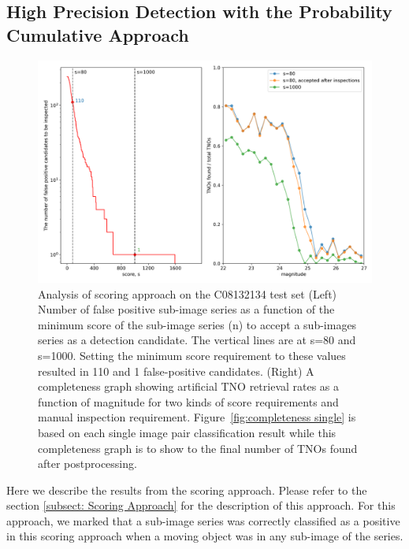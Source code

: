 \subsection{High Precision Detection with the Probability Cumulative Approach}
\label{subsect: High precision with the Probability Cumulative Approach}

\begin{figure}[ht]
    \centering
    \includegraphics[width=\textwidth,keepaspectratio]{Figures/completeness_with_score.png}
    \caption{Analysis of scoring approach on the C08132134 test set (Left) Number of false positive sub-image series as a function of the minimum score of the sub-image series (n) to accept a sub-images series as a detection candidate.
    The vertical lines are at s=80 and s=1000.
    Setting the minimum score requirement to these values resulted in 110 and 1 false-positive candidates.
    (Right) A completeness graph showing artificial TNO retrieval rates as a function of magnitude for two kinds of score requirements and manual inspection requirement.
    Figure~\ref{fig:completeness single} is based on each single image pair classification result while this completeness graph is to show to the final number of TNOs found after postprocessing.
    }
    \label{fig:completeness with movies}
\end{figure}

Here we describe the results from the scoring approach.
Please refer to the section \ref{subsect: Scoring Approach} for the description of this approach.
For this approach, we marked that a sub-image series was correctly classified as a positive in this scoring approach when a moving object was in any sub-image of the series.

